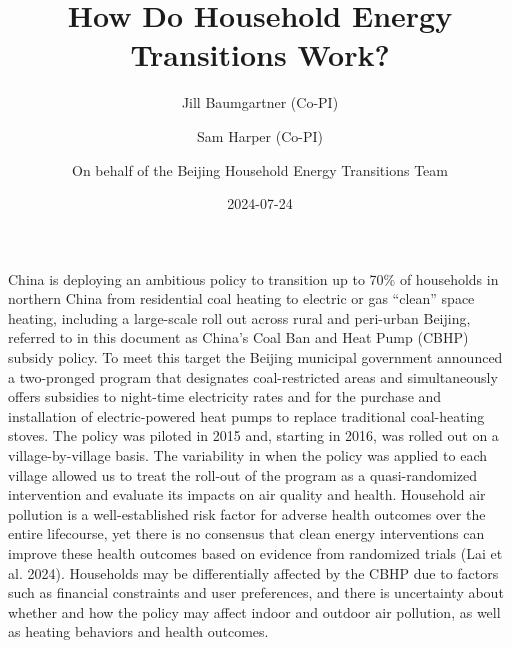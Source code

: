 \documentclass[
  letterpaper,
  DIV=11,
  numbers=noendperiod]{scrartcl}
\title{How Do Household Energy Transitions Work?}
\author{Jill Baumgartner (Co-PI) \and Sam Harper (Co-PI) \and On behalf
of the Beijing Household Energy Transitions Team}
\date{2024-07-24}
\renewcommand*\contentsname{Table of contents}
\newcommand\contentsname{Table of contents}
\providecommand{\DIFaddtex}[1]{{\protect\color{blue}\uwave{#1}}} %
\providecommand{\DIFaddbegin}{} %
\providecommand{\DIFaddend}{} %
\providecommand{\DIFdelbegin}{} %
\providecommand{\DIFdelend}{} %
\providecommand{\DIFadd}[1]{\texorpdfstring{\DIFaddtex{#1}}{#1}} %
\newcommand{\DIFscaledelfig}{0.5}
\newlength{\DIFdelgraphicswidth} %
\newlength{\DIFdelgraphicsheight} %
\newcommand{\DIFaddincludegraphics}[2][]{{\color{blue}\fbox{\DIFOincludegraphics[#1]{#2}}}} %
\newcommand{\DIFdelincludegraphics}[2][]{%
\sbox{\DIFdelgraphicsbox}{\DIFOincludegraphics[#1]{#2}}%
\settoboxwidth{\DIFdelgraphicswidth}{\DIFdelgraphicsbox} %
\settoboxtotalheight{\DIFdelgraphicsheight}{\DIFdelgraphicsbox} %
\scalebox{\DIFscaledelfig}{%
\parbox[b]{\DIFdelgraphicswidth}{\usebox{\DIFdelgraphicsbox}\\[-\baselineskip] \rule{\DIFdelgraphicswidth}{0em}}\llap{\resizebox{\DIFdelgraphicswidth}{\DIFdelgraphicsheight}{%
\setlength{\unitlength}{\DIFdelgraphicswidth}%
\begin{picture}(1,1)%
\thicklines\linethickness{2pt} %
{\color[rgb]{1,0,0}\put(0,0){\framebox(1,1){}}}%
{\color[rgb]{1,0,0}\put(0,0){\line( 1,1){1}}}%
{\color[rgb]{1,0,0}\put(0,1){\line(1,-1){1}}}%
\end{picture}%
}\hspace*{3pt}}} %
} %
\DeclareRobustCommand{\DIFaddbegin}{\DIFOaddbegin \let\includegraphics\DIFaddincludegraphics} %
\DeclareRobustCommand{\DIFaddend}{\DIFOaddend \let\includegraphics\DIFOincludegraphics} %
\DeclareRobustCommand{\DIFdelbegin}{\DIFOdelbegin \let\includegraphics\DIFdelincludegraphics} %
\DeclareRobustCommand{\DIFdelend}{\DIFOaddend \let\includegraphics\DIFOincludegraphics} %
\begin{document}
\maketitle
\DIFdelbegin %

\DIFdelend \renewcommand*\contentsname{Table of contents}
{
\hypersetup{linkcolor=}
\setcounter{tocdepth}{3}
\tableofcontents
}
\newpage

\DIFdelbegin %
\DIFdelend \DIFaddbegin \section{\DIFadd{Introduction}}\label{introduction}
\DIFaddend 

China is deploying an ambitious policy to transition up to 70\% of
households in northern China from residential coal heating to electric
or gas ``clean'' space heating, including a large-scale roll out across
rural and peri-urban Beijing, referred to in this document as China's
Coal Ban and Heat Pump (CBHP) subsidy policy. To meet this target the
Beijing municipal government announced a two-pronged program that
designates coal-restricted areas and simultaneously offers subsidies to
night-time electricity rates and for the purchase and installation of
electric-powered heat pumps to replace traditional coal-heating stoves.
The policy was piloted in 2015 and, starting in 2016, was rolled out on
a village-by-village basis. The variability in when the policy was
applied to each village allowed us to treat the roll-out of the program
as a quasi-randomized intervention and evaluate its impacts on air
quality and health. Household air pollution is a well-established risk
factor for adverse health outcomes over the entire lifecourse, yet there
is no consensus that clean energy interventions can improve these health
outcomes based on evidence from randomized trials (Lai et al. 2024).
Households may be differentially affected by the CBHP due to factors
such as financial constraints and user preferences, and there is
uncertainty about whether and how the policy may affect indoor and
outdoor air pollution, as well as heating behaviors and health outcomes.
\end{document}
